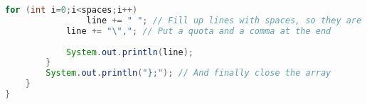 \begin{lstlisting}[language=Java]
			for (int i=0;i<spaces;i++)
				line += " "; // Fill up lines with spaces, so they are all the same length
			line += "\","; // Put a quota and a comma at the end
			
			System.out.println(line);
		}
		System.out.println("};"); // And finally close the array
	}
}
\end{lstlisting}
\newpage
